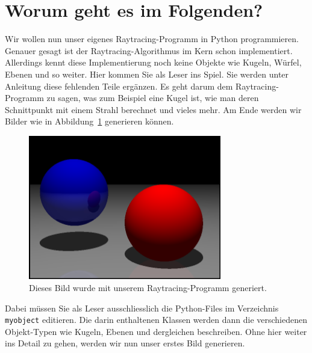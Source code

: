 \documentclass[12pt,a4paper]{article}
\theoremstyle{definition}
\theoremstyle{definition}
\begin{document}
	\section*{Worum geht es im Folgenden?}
	Wir wollen nun unser eigenes Raytracing-Programm in Python programmieren.
	Genauer gesagt ist der Raytracing-Algorithmus im Kern schon implementiert.
	Allerdings kennt diese Implementierung noch keine Objekte wie Kugeln, Würfel, Ebenen und so weiter.
	Hier kommen Sie als Leser ins Spiel.
	Sie werden unter Anleitung diese fehlenden Teile ergänzen.
	Es geht darum dem Raytracing-Programm zu sagen, was zum Beispiel eine Kugel ist, wie man deren Schnittpunkt mit einem Strahl berechnet und vieles mehr.
	Am Ende werden wir Bilder wie in Abbildung~\ref{fig:goal} generieren können.
	\begin{figure}[h!]
		\centering
		\includegraphics[width=0.75\textwidth]{images/outlook.png}
		\caption{Dieses Bild wurde mit unserem Raytracing-Programm generiert.}
		\label{fig:goal}
	\end{figure}
	Dabei müssen Sie als Leser ausschliesslich die Python-Files im Verzeichnis \texttt{myobject} editieren.
	Die darin enthaltenen Klassen werden dann die verschiedenen Objekt-Typen wie Kugeln, Ebenen und dergleichen beschreiben.
	Ohne hier weiter ins Detail zu gehen, werden wir nun unser erstes Bild generieren.
\end{document}
